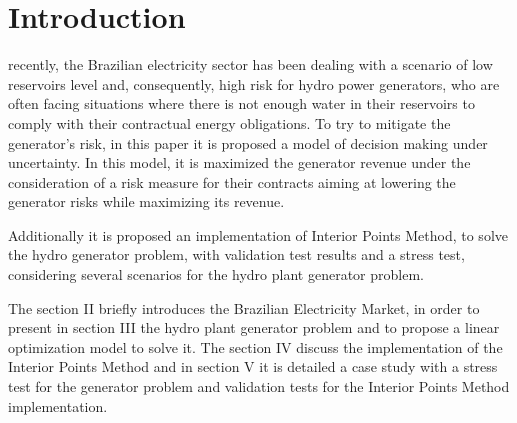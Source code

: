 \documentclass[a4paper]{IEEEtran}
\begin{document}
%
\IEEEpeerreviewmaketitle



\section{Introduction}
% 
% 
% 
% 
 recently, the Brazilian electricity sector has been dealing with a scenario of low reservoirs level and, consequently, high   risk for hydro power generators, who are often facing situations where there is not enough water in their reservoirs to comply with their contractual energy obligations. To try to mitigate the generator's risk, in this paper it is proposed a model of decision making under uncertainty. In this model, it is maximized the generator revenue under the consideration of a risk measure for their contracts aiming at lowering the generator risks while maximizing its revenue. 

Additionally it is proposed an implementation of Interior Points Method, to solve the hydro generator problem, with validation test results and a stress test, considering several scenarios for the hydro plant generator problem.

The section II briefly introduces the Brazilian Electricity Market, in order to present in section III the hydro plant generator problem and to propose a linear optimization model to solve it. The section IV discuss the implementation of the Interior Points Method and in section V it is detailed a case study with a stress test for the generator problem and validation tests for the Interior Points Method implementation.
\end{document}
